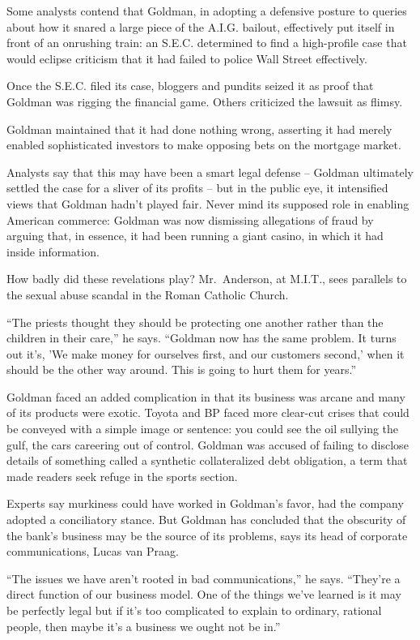 ﻿\documentclass[12pt]{article}
\begin{document}
Some analysts contend that Goldman, in adopting a defensive posture to queries about how it snared a
large piece of the A.I.G. bailout, effectively put itself in front of an onrushing train: an S.E.C.
determined to find a high-profile case that would eclipse criticism that it had failed to police
Wall Street effectively.

Once the S.E.C. filed its case, bloggers and pundits seized it as proof that Goldman was rigging the
financial game. Others criticized the lawsuit as flimsy.

Goldman maintained that it had done nothing wrong, asserting it had merely enabled sophisticated
investors to make opposing bets on the mortgage market.

Analysts say that this may have been a smart legal defense -- Goldman ultimately settled the case
for a sliver of its profits -- but in the public eye, it intensified views that Goldman hadn't
played fair. Never mind its supposed role in enabling American commerce: Goldman was now dismissing
allegations of fraud by arguing that, in essence, it had been running a giant casino, in which it
had inside information.

How badly did these revelations play? Mr.~Anderson, at M.I.T., sees parallels to the sexual abuse
scandal in the Roman Catholic Church.

``The priests thought they should be protecting one another rather than the children in their
care,'' he says. ``Goldman now has the same problem. It turns out it's, 'We make money for ourselves
first, and our customers second,' when it should be the other way around. This is going to hurt them
for years.''

Goldman faced an added complication in that its business was arcane and many of its products were
exotic. Toyota and BP faced more clear-cut crises that could be conveyed with a simple image or
sentence: you could see the oil sullying the gulf, the cars careering out of control. Goldman was
accused of failing to disclose details of something called a synthetic collateralized debt
obligation, a term that made readers seek refuge in the sports section.

Experts say murkiness could have worked in Goldman's favor, had the company adopted a conciliatory
stance. But Goldman has concluded that the obscurity of the bank's business may be the source of its
problems, says its head of corporate communications, Lucas van Praag.

``The issues we have aren't rooted in bad communications,'' he says. ``They're a direct function of
our business model. One of the things we've learned is it may be perfectly legal but if it's too
complicated to explain to ordinary, rational people, then maybe it's a business we ought not be
in.''
\end{document}
